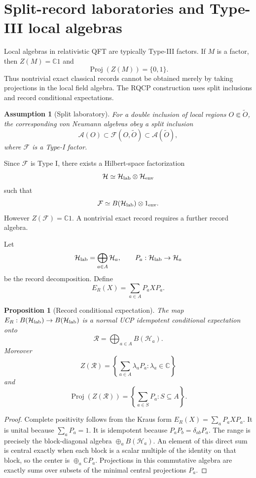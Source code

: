 \documentclass[11pt]{article}
\newtheorem{proposition}[theorem]{Proposition}
\newtheorem{assumption}[theorem]{Assumption}
\newcommand{\A}{\mathcal A}
\newcommand{\F}{\mathcal F}
\newcommand{\Hh}{\mathcal H}
\newcommand{\R}{\mathcal R}
\DeclareMathOperator{\Proj}{Proj}
\begin{document}
\section{Split-record laboratories and Type-III local algebras}\label{app:split}

Local algebras in relativistic QFT are typically Type-III factors.  If $M$ is a factor, then $Z(M)=\mathbb C1$ and
\[
\Proj(Z(M))=\{0,1\}.
\]
Thus nontrivial exact classical records cannot be obtained merely by taking projections in the local field algebra.  The RQCP construction uses split inclusions and record conditional expectations.

\begin{assumption}[Split laboratory]
For a double inclusion of local regions $O\Subset\widetilde O$, the corresponding von Neumann algebras obey a split inclusion
\[
\A(O)\subset\F(O,\widetilde O)\subset\A(\widetilde O),
\]
where $\F$ is a Type-I factor.
\end{assumption}

Since $\F$ is Type I, there exists a Hilbert-space factorization
\[
\Hh\simeq\Hh_{\rm lab}\otimes\Hh_{\rm env}
\]
such that
\[
\F\simeq B(\Hh_{\rm lab})\otimes1_{\rm env}.
\]
However $Z(\F)=\mathbb C1$.  A nontrivial exact record requires a further record algebra.

Let
\[
\Hh_{\rm lab}=\bigoplus_{a\in A}\Hh_a,
\qquad
P_a:\Hh_{\rm lab}\to\Hh_a
\]
be the record decomposition.  Define
\[
E_R(X)=\sum_{a\in A}P_aXP_a.
\]

\begin{proposition}[Record conditional expectation]\label{prop:recordexpectation}
The map $E_R:B(\Hh_{\rm lab})\to B(\Hh_{\rm lab})$ is a normal UCP idempotent conditional expectation onto
\[
\R=\bigoplus_{a\in A}B(\Hh_a).
\]
Moreover
\[
Z(\R)=\left\{\sum_{a\in A}\lambda_aP_a:\lambda_a\in\mathbb C\right\}
\]
and
\[
\Proj(Z(\R))=\left\{\sum_{a\in S}P_a:S\subseteq A\right\}.
\]
\end{proposition}

\begin{proof}
Complete positivity follows from the Kraus form $E_R(X)=\sum_aP_aXP_a$.  It is unital because $\sum_aP_a=1$.  It is idempotent because $P_aP_b=\delta_{ab}P_a$.  The range is precisely the block-diagonal algebra $\oplus_aB(\Hh_a)$.  An element of this direct sum is central exactly when each block is a scalar multiple of the identity on that block, so the center is $\oplus_a\mathbb CP_a$.  Projections in this commutative algebra are exactly sums over subsets of the minimal central projections $P_a$.
\end{proof}
\end{document}
